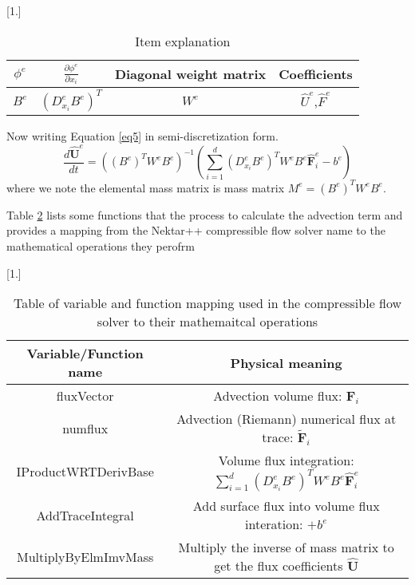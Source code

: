 \begin {table}[H]
\caption {Item explanation} \label{table2} 
\begin{center}
\scalebox{0.9}[1.]{
\begin{tabular}{| c|c|c|c|}
  \hline      
$\phi^{e}$ & $\frac{\partial \phi^{e}}{\partial x_{i}}$& Diagonal weight matrix & Coefficients\\
  \hline
$B^{e}$ &$(D^{e}_{x_{i}} B^{e})^{T}$& $W^{e}$& $\hat{U}^{e}$,$\hat{F}^{e}$\\
  \hline
\end{tabular}
}
\end{center}
\end{table}

Now writing Equation \eqref{eq5} in semi-discretization form.
\begin{equation}\label{eq8}
\frac{d \hat{\textbf{U}}^{e}}{d t}
=((B^{e})^{T}W^{e}B^{e})^{-1}(\sum\limits_{i=1}^{d}{(D^{e}_{x_{i}} B^{e})^{T}}W^{e}B^{e}\hat{\textbf{F}}^{e}_{i}-
b^{e})
\end{equation}
where we note the elemental mass matrix is mass matrix $M^{e}=(B^{e})^{T}W^{e}B^{e}$.

Table \ref{table1} lists some functions that the process to calculate the advection term and provides a mapping from the Nektar++ compressible flow solver name to the mathematical operations they perofrm 
\begin {table}[h]
\caption {Table of variable and function mapping used in the compressible flow solver to their mathemaitcal operations} \label{table1} 
\begin{center}
\scalebox{0.9}[1.]{
\begin{tabular}{ | c | c|}
  \hline      
Variable/Function name & Physical meaning \\  
  \hline
  fluxVector  & Advection volume flux: $\textbf{F}_{i}$\\
  \hline
  numflux  & Advection (Riemann) numerical flux at trace: $\widetilde{\textbf{F}}_{i}$\\
   \hline
  IProductWRTDerivBase &  Volume flux integration: $\sum\limits_{i=1}^{d}{(D^{e}_{x_{i}} B^{e})^{T}}W^{e}B^{e}\hat{\textbf{F}}^{e}_{i}$ \\
   \hline
   AddTraceIntegral &  Add surface flux into volume flux interation: $+b^{e}$\\ 
  \hline
  MultiplyByElmImvMass& Multiply the inverse of mass matrix to get the flux coefficients $ \hat{\textbf{U}}$\\
 \hline
\end{tabular}
}
\end{center}
\end{table}



